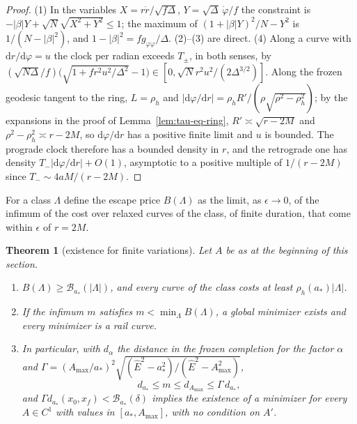 \documentclass[aip,jmp,amsmath,amssymb,reprint]{revtex4-2}
\newcommand{\Ehat}{\hat E}
\newcommand{\dd}{\mathrm{d}}
\theoremstyle{plain}
\newtheorem{theorem}{Theorem}
\theoremstyle{definition}
\begin{document}
\begin{proof}
(1) In the variables $X=r\dot r/\sqrt{f\Delta}$, $Y=\sqrt\Delta\,\dot\varphi/f$ the constraint is
$-|\beta|Y+\sqrt N\sqrt{X^2+Y^2}\le1$; the maximum of $(1+|\beta|Y)^2/N-Y^2$ is $1/(N-|\beta|^2)$, and
$1-|\beta|^2=fg_{\varphi\varphi}/\Delta$. (2)--(3) are direct. (4) Along a curve with $\dd r/\dd\varphi=u$ the
clock per radian exceeds $T_\pm$, in both senses, by
$(\sqrt{N\Delta}/f)\bigl(\sqrt{1+fr^2u^2/\Delta^2}-1\bigr)\in[0,\sqrt Nr^2u^2/(2\Delta^{3/2})]$. Along the frozen geodesic
tangent to the ring, $L=\rho_h$ and $|\dd\varphi/\dd r|=\rho_hR'/(\rho\sqrt{\rho^2-\rho_h^2})$; by the expansions in the
proof of Lemma~\ref{lem:tau-eq-ring}, $R'\asymp\sqrt{r-2M}$ and $\rho^2-\rho_h^2\asymp r-2M$, so $\dd\varphi/\dd r$ has a
positive finite limit and $u$ is bounded. The prograde clock therefore has a bounded density in $r$, and the
retrograde one has density $T_-|\dd\varphi/\dd r|+O(1)$, asymptotic to a positive multiple of $1/(r-2M)$ since
$T_-\sim4aM/(r-2M)$.
\end{proof}

For a class $\Lambda$ define the escape price $B(\Lambda)$ as the limit, as $\epsilon\to0$, of the infimum of
the cost over relaxed curves of the class, of finite duration, that come within $\epsilon$ of $r=2M$.

\begin{theorem}[existence for finite variations]\label{thm:tau-eq-exist}
Let $A$ be as at the beginning of this section.
\begin{enumerate}
\item $B(\Lambda)\ge\mathcal B_{a_*}(|\Lambda|)$, and every curve of the class costs at least $\rho_h(a_*)|\Lambda|$.
\item If the infimum $m$ satisfies $m<\min_\Lambda B(\Lambda)$, a global minimizer exists and every minimizer
  is a rail curve.
\item In particular, with $d_\alpha$ the distance in the frozen completion for the factor $\alpha$ and
  $\Gamma=(A_{\max}/a_*)^2\sqrt{(\Ehat^2-a_*^2)/(\Ehat^2-A_{\max}^2)}$,
  \[
    d_{a_*}\le m\le d_{A_{\max}}\le\Gamma\,d_{a_*},
  \]
  and $\Gamma d_{a_*}(x_0,x_f)<\mathcal B_{a_*}(\delta)$ implies the existence of a minimizer for every
  $A\in C^1$ with values in $[a_*,A_{\max}]$, with no condition on $A'$.
\end{enumerate}
\end{theorem}
\end{document}
